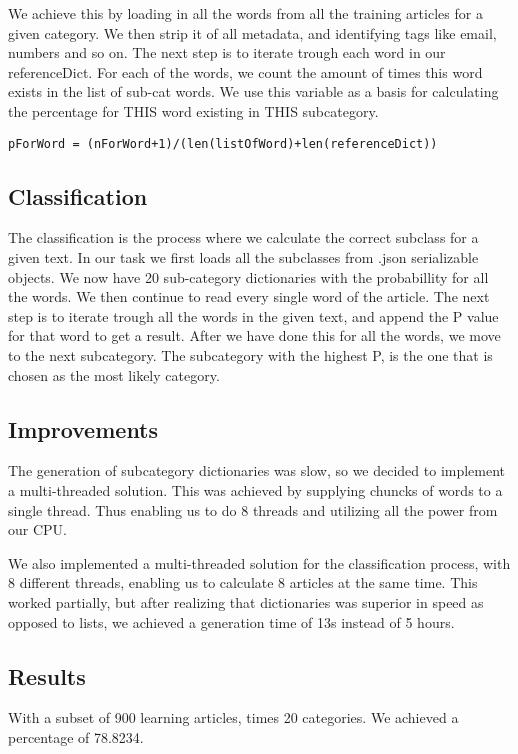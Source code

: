 \documentclass{article}
\begin{document}
\newline
\noindent We achieve this by loading in all the words from all the training articles for a given category. We then strip it of
all metadata, and identifying tags like email, numbers and so on. The next step is to iterate trough each word in our referenceDict.
For each of the words, we count the amount of times this word exists in the list of sub-cat words. We use this variable as a basis
for calculating the percentage for THIS word existing in THIS subcategory.

\begin {lstlisting}
pForWord = (nForWord+1)/(len(listOfWord)+len(referenceDict))
\end{lstlisting}

\newline

\subsection {Classification}
The classification is the process where we calculate the correct subclass for a given text. In our task we first loads all the
subclasses from .json serializable objects. We now have 20 sub-category dictionaries with the probabillity for all the words. We
then continue to read every single word of the article. The next step is to iterate trough all the words in the given text, and append
the P value for that word to get a result. After we have done this for all the words, we move to the next subcategory. The subcategory
with the highest P, is the one that is chosen as the most likely category.

\subsection {Improvements}
The generation of subcategory dictionaries was slow, so we decided to implement a multi-threaded solution. This was achieved by supplying
chuncks of words to a single thread. Thus enabling us to do 8 threads and utilizing all the power from our CPU.

\newline
\noindent We also implemented a multi-threaded solution for the classification process, with 8
different threads, enabling us to calculate 8 articles at the same time.  This worked partially, but after realizing
that dictionaries was superior in speed as opposed to lists, we achieved a generation time of 13s instead of 5 hours.



\subsection {Results}
With a subset of 900 learning articles, times 20 categories. We achieved a percentage of 78.8234.
\end{document}
